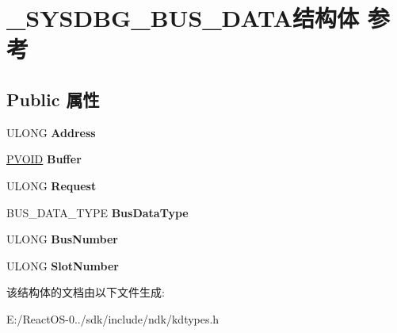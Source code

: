 \hypertarget{struct___s_y_s_d_b_g___b_u_s___d_a_t_a}{}\section{\+\_\+\+S\+Y\+S\+D\+B\+G\+\_\+\+B\+U\+S\+\_\+\+D\+A\+T\+A结构体 参考}
\label{struct___s_y_s_d_b_g___b_u_s___d_a_t_a}
\subsection*{Public 属性}
\begin{DoxyCompactItemize}
\item 
\mbox{\label{struct___s_y_s_d_b_g___b_u_s___d_a_t_a_a2a4cc92b393b5aa9484ab518adb71ce0}} 
U\+L\+O\+NG {\bfseries Address}
\item 
\mbox{\label{struct___s_y_s_d_b_g___b_u_s___d_a_t_a_a00007983f6b1f57bab22a2d868e78ff2}} 
\hyperlink{interfacevoid}{P\+V\+O\+ID} {\bfseries Buffer}
\item 
\mbox{\label{struct___s_y_s_d_b_g___b_u_s___d_a_t_a_a27f2e20ec2597e99ba68f50bdfd1ba33}} 
U\+L\+O\+NG {\bfseries Request}
\item 
\mbox{\label{struct___s_y_s_d_b_g___b_u_s___d_a_t_a_aad2a5dfc6733a801dfa3a3572427d32f}} 
B\+U\+S\+\_\+\+D\+A\+T\+A\+\_\+\+T\+Y\+PE {\bfseries Bus\+Data\+Type}
\item 
\mbox{\label{struct___s_y_s_d_b_g___b_u_s___d_a_t_a_a04c25e9ff1b76b669f39094557b697f1}} 
U\+L\+O\+NG {\bfseries Bus\+Number}
\item 
\mbox{\label{struct___s_y_s_d_b_g___b_u_s___d_a_t_a_a2fd267ba3434f707767754c8fd46bc03}} 
U\+L\+O\+NG {\bfseries Slot\+Number}
\end{DoxyCompactItemize}


该结构体的文档由以下文件生成\+:\begin{DoxyCompactItemize}
\item 
E\+:/\+React\+O\+S-\/0../sdk/include/ndk/kdtypes.\+h\end{DoxyCompactItemize}
